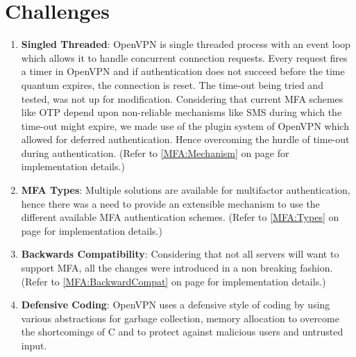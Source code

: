 \documentclass[11pt,oneside]{book}
\begin{document}
\section{Challenges}
\begin{enumerate}
    \item \textbf{Singled Threaded}: OpenVPN is single threaded process with an event loop which
        allows it to handle concurrent connection requests. Every request fires a timer in OpenVPN
        and if authentication does not succeed before the time quantum expires, the connection is
        reset. The time-out being tried and tested, was not up for modification.
        Considering that current MFA schemes like OTP depend upon non-reliable mechanisms like
        SMS during which the time-out might expire, we made use of the plugin system of OpenVPN
        which allowed for deferred authentication. Hence overcoming the hurdle of time-out
        during authentication.
        (Refer to \ref{MFA:Mechanism} on page \pageref{MFA:Mechanism} for implementation details.)
    \item \textbf{MFA Types}: Multiple solutions are available for multifactor authentication, hence
        there was a need to provide an extensible mechanism to use the different available MFA
        authentication schemes. (Refer to \ref{MFA:Types} on page \pageref{MFA:Types} for
        implementation details.)
    \item \textbf{Backwards Compatibility}: Considering that not all servers will want to support
        MFA, all the changes were introduced in a non breaking fashion.
        (Refer to \ref{MFA:BackwardCompat} on page \pageref{MFA:BackwardCompat} for implementation details.)
    \item \textbf{Defensive Coding}: OpenVPN uses a defensive style of coding by using various
        abstractions for garbage collection, memory allocation to overcome the shortcomings of C and to protect against malicious users and untrusted input.
\end{enumerate}
\end{document}
